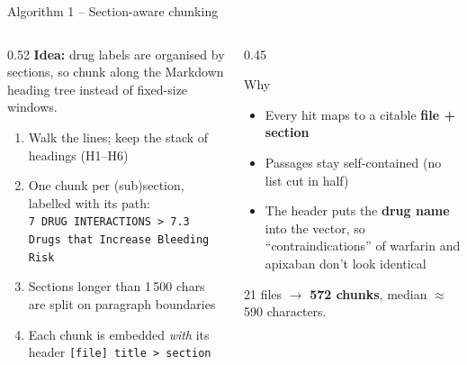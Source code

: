 \documentclass[aspectratio=169,11pt]{beamer}
\newcommand{\file}[1]{\texttt{\small #1}}
\begin{document}
\begin{frame}{Algorithm 1 -- Section-aware chunking}
  \begin{columns}[T]
    \begin{column}{0.52\textwidth}
      \textbf{Idea:} drug labels are organised by sections, so chunk along the
      Markdown heading tree instead of fixed-size windows.
      \begin{enumerate}
        \item Walk the lines; keep the stack of headings (H1--H6)
        \item One chunk per (sub)section, labelled with its path:\\
              \file{7 DRUG INTERACTIONS > 7.3 Drugs that Increase Bleeding Risk}
        \item Sections longer than 1\,500 chars are split on paragraph boundaries
        \item Each chunk is embedded \emph{with} its header \file{[file] title > section}
      \end{enumerate}
    \end{column}
    \begin{column}{0.45\textwidth}
      \begin{block}{Why}
        \small
        \begin{itemize}
          \item Every hit maps to a citable \textbf{file + section}
          \item Passages stay self-contained (no list cut in half)
          \item The header puts the \textbf{drug name} into the vector, so ``contraindications'' of warfarin and apixaban don't look identical
        \end{itemize}
      \end{block}
      \vspace{0.3em}
      {\small 21 files $\rightarrow$ \textbf{572 chunks}, median $\approx$ 590 characters.}
    \end{column}
  \end{columns}
\end{frame}
\end{document}
